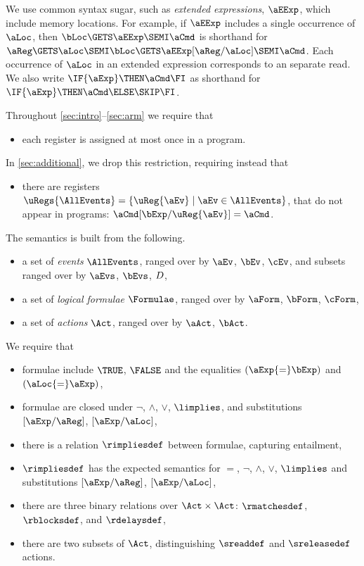 We use common syntax sugar, such as \emph{extended expressions}, $\aEExp$,
which include memory locations.  For example, if $\aEExp$ includes a single
occurrence of $\aLoc$, then $\bLoc\GETS\aEExp\SEMI \aCmd$ is shorthand for
$\aReg\GETS\aLoc\SEMI\bLoc\GETS\aEExp[\aReg/\aLoc]\SEMI \aCmd$.  Each
occurrence of $\aLoc$ in an extended expression corresponds to an separate
read.  We also write $\IF{\aExp} \THEN \aCmd \FI$ as shorthand for
$\IF{\aExp} \THEN \aCmd\ELSE \SKIP\FI$.



Throughout \textsection\ref{sec:intro}--\ref{sec:arm} we 
require that
\begin{itemize}
\item each register is assigned at most once in a program.
\end{itemize}
In \textsection\ref{sec:additional}, we drop this restriction, requiring
instead that
\begin{itemize}
\item there are registers
  $\uRegs{\AllEvents}=\{\uReg{\aEv}\mid\aEv\in\AllEvents\}$, that do not
  appear in programs: $\aCmd[\bExp/\uReg{\aEv}]=\aCmd$.
\end{itemize}

The semantics is built from the following.
\begin{itemize}
\item a set of \emph{events} $\AllEvents$, ranged over by $\aEv$, $\bEv$,
  $\cEv$, %
  and subsets ranged over by $\aEvs$, $\bEvs$, $D$,  
\item a set of \emph{logical formulae} $\Formulae$, ranged over by $\aForm$,
  $\bForm$, $\cForm$,
\item a set of \emph{actions} $\Act$, ranged over by $\aAct$, $\bAct$.
\end{itemize}

We require that
\begin{itemize}
\item formulae include $\TRUE$, $\FALSE$ and the equalities $(\aExp{=}\bExp)$ and $(\aLoc{=}\aExp)$,
\item formulae are closed under $\lnot$, $\land$, $\lor$, $\limplies$, and
  substitutions $[\aExp/\aReg]$, $[\aExp/\aLoc]$,
\item there is a relation $\rimpliesdef$ between
  formulae, capturing entailment, %
\item $\rimpliesdef$ has the expected semantics for $=$, $\lnot$,
  $\land$, $\lor$, $\limplies$ and substitutions $[\aExp/\aReg]$, $[\aExp/\aLoc]$,
\item there are three binary relations over $\Act\times\Act$:
  $\rmatchesdef$, $\rblocksdef$, and $\rdelaysdef$,
\item there are two subsets of $\Act$, distinguishing
  $\sreaddef$ and $\sreleasedef$ actions.
\end{itemize}


